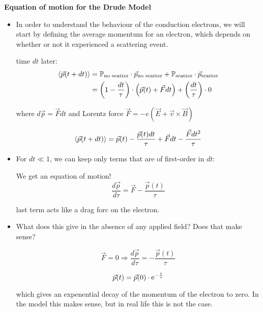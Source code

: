 \textbf{Equation of motion for the Drude Model}
\begin{itemize}
    \item In order to understand the behaviour of the conduction electrons, we will start by defining the average momentum for an electron, which depends on whether or not it experienced a scattering event.
    
    time $dt$ later: 
    \[
    \begin{aligned}
    \avg{\vec{p}(t+dt)} &= \Prob_{\text{no scatter}} \cdot \vec{p}_{\text{no scatter}} + \Prob_{\text{scatter}} \cdot \vec{p}_{\text{scatter}} \\
    &= \paren*{1-\frac{dt}{\tau}} \cdot \paren*{\vec{p}(t) + \vec{F}dt} + \paren*{\frac{dt}{\tau}} \cdot 0
    \end{aligned}
    \]

    where $d\vec{p} = \vec{F} dt $ and Lorentz force $\vec{F} = -e (\vec{E} + \vec{v} \times \vec{B})$

    \[ \avg{\vec{p}(t+dt)} = \vec{p}(t)-\frac{\vec{p}(t) dt}{\tau} + \vec{F}dt - \frac{\vec{F} dt^2}{\tau} \]


    \item For $dt \ll 1$, we can keep only terms that are of first-order in $dt$:
    
    We get an equation of motion!
    \[ \boxed{\frac{d\vec{p}}{d\tau} = \vec{F} - \frac{\vec{p}(t)}{\tau}} \]

    last term acts like a drag forc on the electron.
    
    \item What does this give in the absence of any applied field? Does that make sense?
    
    \[ \vec{F} = 0 \Rightarrow \frac{d\vec{p}}{d\tau} = -\frac{\vec{p}(t)}{\tau} \]

    \[ \vec{p}(t) = \vec{p}(0) \cdot \e^{-\frac{t}{\tau}} \]

    which gives an expenential decay of the momentum of the electron to zero. In the model this makes sense, but in real life this is not the case.
    
\end{itemize}








